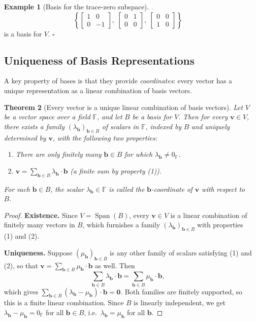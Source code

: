 \documentclass[11pt, a4paper, notitlepage]{report}
\newtheorem{theorem}{Theorem}[section]
\theoremstyle{definition}
\newtheorem{example}[theorem]{Example}
\theoremstyle{remark}
\begin{document}
\begin{example}[Basis for the trace-zero subspace]
\[
  \left\{\begin{bmatrix}1&0\\0&-1\end{bmatrix},\; \begin{bmatrix}0&1\\0&0\end{bmatrix},\; \begin{bmatrix}0&0\\1&0\end{bmatrix}\right\}
\]
is a basis for $V$. $\square$
\end{example}

\subsection{Uniqueness of Basis Representations}

A key property of bases is that they provide \emph{coordinates}: every vector has a unique representation as a linear combination of basis vectors.

\begin{theorem}[Every vector is a unique linear combination of basis vectors]\label{thm:unique-basis-rep}
Let $V$ be a vector space over a field $\mathbb{F}$, and let $B$ be a basis for $V$. Then for every $\mathbf{v}\in V$, there exists a family $(\lambda_\mathbf{b})_{\mathbf{b}\in B}$ of scalars in $\mathbb{F}$, indexed by $B$ and \emph{uniquely determined} by $\mathbf{v}$, with the following two properties:
\begin{enumerate}
  \item There are only finitely many $\mathbf{b}\in B$ for which $\lambda_\mathbf{b}\neq 0_\mathbb{F}$.
  \item $\mathbf{v} = \displaystyle\sum_{\mathbf{b}\in B}\lambda_\mathbf{b}\cdot\mathbf{b}$ \quad (a finite sum by property (1)).
\end{enumerate}
For each $\mathbf{b}\in B$, the scalar $\lambda_\mathbf{b}\in\mathbb{F}$ is called the \emph{$\mathbf{b}$-coordinate of $\mathbf{v}$ with respect to $B$}.
\end{theorem}

\begin{proof}
\textbf{Existence.} Since $V = \operatorname{Span}(B)$, every $\mathbf{v}\in V$ is a linear combination of finitely many vectors in $B$, which furnishes a family $(\lambda_\mathbf{b})_{\mathbf{b}\in B}$ with properties (1) and (2).

\textbf{Uniqueness.} Suppose $(\mu_\mathbf{b})_{\mathbf{b}\in B}$ is any other family of scalars satisfying (1) and (2), so that $\mathbf{v} = \sum_{\mathbf{b}\in B}\mu_\mathbf{b}\cdot\mathbf{b}$ as well. Then
\[
  \sum_{\mathbf{b}\in B}\lambda_\mathbf{b}\cdot\mathbf{b} = \sum_{\mathbf{b}\in B}\mu_\mathbf{b}\cdot\mathbf{b},
\]
which gives $\sum_{\mathbf{b}\in B}(\lambda_\mathbf{b}-\mu_\mathbf{b})\cdot\mathbf{b} = \mathbf{0}$. Both families are finitely supported, so this is a finite linear combination. Since $B$ is linearly independent, we get $\lambda_\mathbf{b}-\mu_\mathbf{b}=0_\mathbb{F}$ for all $\mathbf{b}\in B$, i.e.\ $\lambda_\mathbf{b}=\mu_\mathbf{b}$ for all $\mathbf{b}$.
\end{proof}
\end{document}
